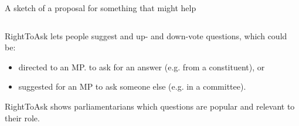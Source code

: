 \documentclass[10pt,xcolor=svgnames,169]{beamer} %
\begin{document}
	\begin{frame}[fragile]{A sketch of a proposal for something that might help}
	
	
	\begin{columns}
		\begin{column}{0.5\textwidth}
			
	RightToAsk lets people
	 suggest and up- and down-vote questions, which could be:
	
	\begin{itemize}
		\item directed to an MP.
		to ask for an answer (e.g. from a constituent), or
		\item suggested for an MP to ask someone else (e.g. in a committee).		
	\end{itemize}

	
	RightToAsk shows parliamentarians which questions are popular and relevant to their role.
	

\end{column}
\end{columns}
\end{frame}
\end{document}
